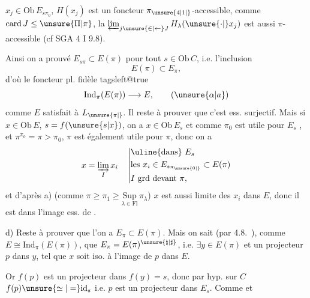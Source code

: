  $x_j\in\mathrm{Ob}\,E_{s\pi_0}$, $H(x_j)$ est un foncteur $\pi_{\unsure{4|1|{}}}$-accessible,  comme $\mathrm{card}\,J\leq\unsure{\Pi|\pi}$, la $\varprojlim_{j\unsure{\in|{\leftarrow}}J}H_\lambda(\unsure{\cdot|{}}x_j)$ est aussi $\pi$-accessible (cf SGA 4 I 9.8).

Ainsi on a prouvé $E_{s\pi}\subset E(\pi)$ pour tout $s\in\mathrm{Ob}\,C$, i.e. l'inclusion
\[E(\pi)\subset E_\pi,\]
d'où le foncteur pl. fidèle
{\csname tagsleft@true\endcsname
\[\mathrm{Ind}_\pi(E(\pi))\longrightarrow E,\tag*{$(\unsure{\alpha|a})$}\]}
comme $E$ satisfait à $L_{\unsure{\pi|{}}}$. Il reste à prouver que c'est ess. surjectif. Mais si $x\in\mathrm{Ob}\,E$, $s=f(\unsure{s|x})$, on a $x\in\mathrm{Ob}\,E_s$ et comme $\pi_0$ est utile pour $E_s$  , et $\pi^{\pi_0}=\pi>\pi_0$, $\pi$ est également utile pour $\pi$, donc on a
\[x=\varinjlim_I x_i\quad\left|\begin{aligned}&\text{\uline{dans} }E_s\\&\text{les }x_i\in E_{s\pi_{\unsure{0|{}}}}\subset E(\pi)\\&I\ \text{grd devant }\pi,\end{aligned}\right.\]
et d'après a) (comme $\pi\geq\pi_1\geq\underset{\lambda\in\mathrm{Fl}}{\mathrm{Sup}}\,\pi_\lambda$) $x$ est aussi limite des $x_i$ dans $E$, donc il est dans  l'image ess. de .

d) Reste à prouver que l'on a $E_\pi\subset E(\pi)$. Mais on sait (par 4.8.\ ),  comme $E\cong\mathrm{Ind}_\pi(E(\pi))$, que $E_\pi=E(\pi)^{\unsure{\natural|\sharp}}$, i.e.  $\exists y\in E(\pi)$ et un projecteur $p$ dans $y$, tel que $x$ soit iso. à l'image de $p$ dans $E$.

Or $f(p)$ est un projecteur dans $f(y)=s$, donc par hyp. sur $C$ $f(p)\unsure{\simeq|=}\mathrm{id}_s$ i.e. $p$ est un projecteur dans $E_s$. Comme   et

